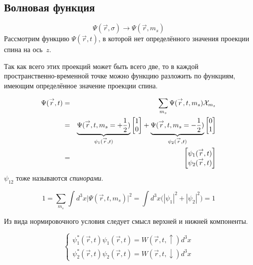 \subsection{Волновая функция}
$$
    \Psi (\vec r, \sigma) \to \Psi (\vec r, m_s)
$$
Рассмотрим функцию $\Psi(\vec r, t)$, в которой нет определённого значения проекции спина на ось~$z$.

Так как всего этих проекций может быть всего две, то в каждой пространственно-временной точке можно функцию разложить по функциям, имеющим определённое значение проекции спина.

\begin{eqnarray*}
    \Psi(\overset{\to}{r}, t) &=& \sum_{m_s} \Psi(\overset{\to}{r}, t, m_s) \mathcal{X}_{m_s}\\
    &=& \underbrace{\Psi(\overset{\to}{r}, t, m_s = +\frac12)}_{\psi_1 (\overset{\to}{r}, t)} \begin{bmatrix}
                                          1 \\
                                          0 \\
                                        \end{bmatrix}
    + \underbrace{\Psi(\overset{\to}{r}, t, m_s = -\frac12)}_{\psi_2 (\overset{\to}{r}, t)} \begin{bmatrix}
                                          0 \\
                                          1 \\
                                        \end{bmatrix}\\
    &=& \begin{bmatrix}
    \psi_1 (\overset{\to}{r}, t) \\
          \psi_2 (\overset{\to}{r}, t) \\
        \end{bmatrix}
\end{eqnarray*}
$\psi_{12}$ тоже называются \emph{спинорами}.

$$
    1 = \sum_{m_s} \int d^3 x \big|
        \Psi(\vec r, t, m_s)
    \big|^2 = \int d^3 x \big(
        |\psi_1|^2 + |\psi_2|^2
    \big) = 1
$$

Из вида нормировочного условия следует смысл верхней и нижней компоненты.

$$
    \begin{cases}
        \psi_1^\ast(\vec r, t) \psi_1(\vec r, t) =  W(\vec r, t, \uparrow) d^3 x\\
        \psi_2^\ast(\vec r, t) \psi_2(\vec r, t) =  W(\vec r, t, \downarrow) d^3 x
    \end{cases}
$$

